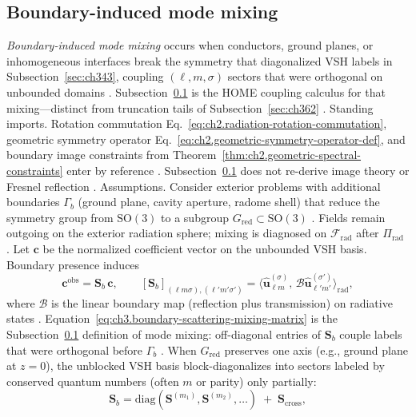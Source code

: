 \subsection{Boundary-induced mode mixing}
\label{sec:ch363}
\emph{Boundary-induced mode mixing} occurs when conductors, ground planes, or inhomogeneous interfaces break the
symmetry that diagonalized VSH labels in Subsection~\ref{sec:ch343}, coupling \((\ell,m,\sigma)\) sectors that were
orthogonal on unbounded domains \cite{stratton1941}. Subsection~\ref{sec:ch363} is the
HOME coupling calculus for that mixing---distinct from truncation tails of Subsection~\ref{sec:ch362}
\cite{hansen1988}.
Standing imports. Rotation commutation Eq.~\eqref{eq:ch2.radiation-rotation-commutation}, geometric symmetry operator
Eq.~\eqref{eq:ch2.geometric-symmetry-operator-def}, and boundary image constraints from
Theorem~\ref{thm:ch2.geometric-spectral-constraints} enter by reference \cite{stratton1941}.
Subsection~\ref{sec:ch363} does not re-derive image theory or Fresnel reflection \cite{jackson1999}.
Assumptions. Consider exterior problems with additional boundaries \(\Gamma_{b}\) (ground plane, cavity aperture, radome shell)
that reduce the symmetry group from \(\mathrm{SO}(3)\) to a subgroup \(G_{\mathrm{red}}\subset\mathrm{SO}(3)\)
\cite{harrington2001}. Fields remain outgoing on the exterior radiation sphere; mixing is diagnosed on
\(\mathcal{F}_{\mathrm{rad}}\) after \(\Pi_{\mathrm{rad}}\) \cite{harrington2001}.
Let \(\mathbf{c}\) be the normalized coefficient vector on the unbounded VSH basis. Boundary presence induces
\begin{equation}
\label{eq:ch3.boundary-scattering-mixing-matrix}
\mathbf{c}^{\mathrm{obs}}
=
\mathbf{S}_{b}\,\mathbf{c},
\qquad
[\mathbf{S}_{b}]_{(\ell m\sigma),(\ell'm'\sigma')}
=
\langle\widehat{\mathbf{u}}_{\ell m}^{(\sigma)},\,\mathcal{B}\widehat{\mathbf{u}}_{\ell'm'}^{(\sigma')}\rangle_{\mathrm{rad}},
\end{equation}
where \(\mathcal{B}\) is the linear boundary map (reflection plus transmission) on radiative states
\cite{stratton1941}. Equation~\eqref{eq:ch3.boundary-scattering-mixing-matrix} is the Subsection~\ref{sec:ch363}
definition of mode mixing: off-diagonal entries of \(\mathbf{S}_{b}\) couple labels that were orthogonal before
\(\Gamma_{b}\) \cite{hansen1988}.
When \(G_{\mathrm{red}}\) preserves one axis (e.g., ground plane at \(z=0\)), the unblocked VSH basis block-diagonalizes
into sectors labeled by conserved quantum numbers (often \(m\) or parity) only partially:
\begin{equation}
\label{eq:ch3.reduced-symmetry-block-form}
\mathbf{S}_{b}
=
\mathrm{diag}(\mathbf{S}^{(m_{1})},\mathbf{S}^{(m_{2})},\ldots)
\;+\;
\mathbf{S}_{\mathrm{cross}},
\end{equation}
